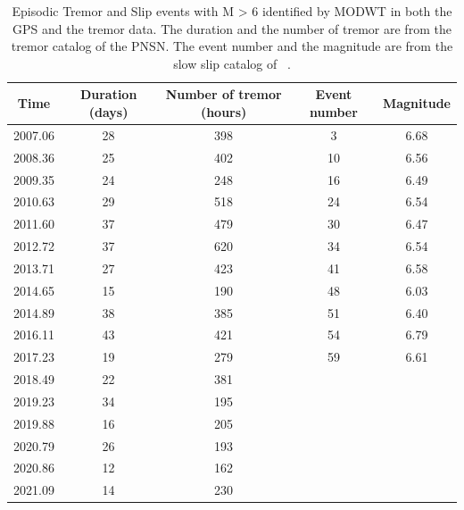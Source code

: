 \documentclass{article}
\begin{document}
\begin{table}[hbt!]
\caption{Episodic Tremor and Slip events with M > 6 identified by MODWT in both the GPS and the tremor data. The duration and the number of tremor are from the tremor catalog of the PNSN. The event number and the magnitude are from the slow slip catalog of ~\citet{MIC_2019}.}
 \centering
 \begin{tabular}{c c c c c}
 \hline
 Time & Duration (days) & Number of tremor (hours) & Event number & Magnitude \\
 \hline
 2007.06 & 28 & 398 & 3 & 6.68 \\
 2008.36 & 25 & 402 & 10 & 6.56 \\
 2009.35 & 24 & 248 & 16 & 6.49 \\
 2010.63 & 29 & 518 & 24 & 6.54 \\
 2011.60 & 37 & 479 & 30 & 6.47 \\
 2012.72 & 37 & 620 & 34 & 6.54 \\
 2013.71 & 27 & 423 & 41 & 6.58 \\
 2014.65 & 15 & 190 & 48 & 6.03 \\
 2014.89 & 38 & 385 & 51 & 6.40 \\
 2016.11 & 43 & 421 & 54 & 6.79 \\
 2017.23 & 19 & 279 & 59 & 6.61 \\
 2018.49 & 22 & 381 & & \\
 2019.23 & 34 & 195 & & \\
 2019.88 & 16 & 205 & & \\
 2020.79 & 26 & 193 & & \\
 2020.86 & 12 & 162 & & \\
 2021.09 & 14 & 230 & & \\
 \hline
 \end{tabular}
 \end{table}
\end{document}
